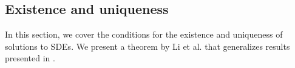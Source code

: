 \documentclass[12pt]{article}
\newtheorem{theorem}{Theorem}[section]
\theoremstyle{definition}
\numberwithin{equation}{section}
\newcommand{\R}{\mathbb{R}}
\newcommand{\ev}[1]{\mathbb{E}\left[{#1}\right]}
\begin{document}
\subsection{Existence and uniqueness}
\label{subsec:SDEExistenceUniqueness}
In this section, we cover the conditions for the existence and uniqueness of solutions to SDEs. We present a theorem by Li et al. \cite{liStochasticModifiedEquations2019} that generalizes results presented in \cite{oksendalStochasticDifferentialEquations2003}. 
\end{document}
